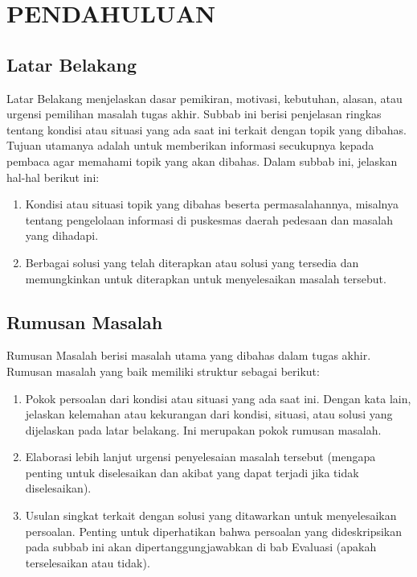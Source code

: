 \chapter{PENDAHULUAN}
\label{chap:pendahuluan}
\section{Latar Belakang}
Latar Belakang menjelaskan dasar pemikiran, motivasi, kebutuhan, alasan, atau urgensi pemilihan masalah tugas akhir. Subbab ini berisi penjelasan ringkas tentang kondisi atau situasi yang ada saat ini terkait dengan topik yang dibahas. Tujuan utamanya adalah untuk memberikan informasi secukupnya kepada pembaca agar memahami topik yang akan dibahas. Dalam subbab ini, jelaskan hal-hal berikut ini:
\begin{enumerate}
\item	Kondisi atau situasi topik yang dibahas beserta permasalahannya, misalnya tentang pengelolaan informasi di puskesmas daerah pedesaan dan masalah yang dihadapi.
\item	Berbagai solusi yang telah diterapkan atau solusi yang tersedia dan memungkinkan untuk diterapkan untuk menyelesaikan masalah tersebut.
\end{enumerate}

\section{Rumusan Masalah}
Rumusan Masalah berisi masalah utama yang dibahas dalam tugas akhir. Rumusan masalah yang baik memiliki struktur sebagai berikut:
\begin{enumerate}
\item	Pokok persoalan dari kondisi atau situasi yang ada saat ini. Dengan kata lain, jelaskan kelemahan atau kekurangan dari kondisi, situasi, atau solusi yang dijelaskan pada latar belakang. Ini merupakan pokok rumusan masalah.
\item	Elaborasi lebih lanjut urgensi penyelesaian masalah tersebut (mengapa penting untuk diselesaikan dan akibat yang dapat terjadi jika tidak diselesaikan).
\item	Usulan singkat terkait dengan solusi yang ditawarkan untuk menyelesaikan persoalan.
Penting untuk diperhatikan bahwa persoalan yang dideskripsikan pada subbab ini akan dipertanggungjawabkan di bab Evaluasi (apakah terselesaikan atau tidak).
\end{enumerate}

